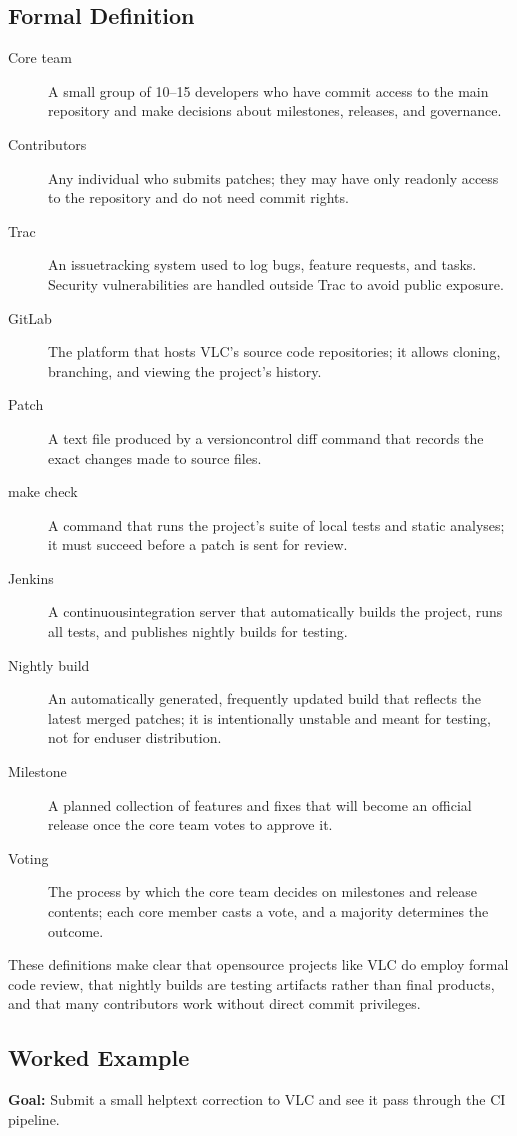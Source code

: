 \documentclass[12pt, a4paper]{article}
\begin{document}
\subsection{Formal Definition}
\begin{description}
\item[Core team] A small group of 10--15 developers who have commit access to the main repository and make decisions about milestones, releases, and governance.
\item[Contributors] Any individual who submits patches; they may have only readonly access to the repository and do not need commit rights.
\item[Trac] An issuetracking system used to log bugs, feature requests, and tasks. Security vulnerabilities are handled outside Trac to avoid public exposure.
\item[GitLab] The platform that hosts VLC's source code repositories; it allows cloning, branching, and viewing the project's history.
\item[Patch] A text file produced by a versioncontrol diff command that records the exact changes made to source files.
\item[make check] A command that runs the project's suite of local tests and static analyses; it must succeed before a patch is sent for review.
\item[Jenkins] A continuousintegration server that automatically builds the project, runs all tests, and publishes nightly builds for testing.
\item[Nightly build] An automatically generated, frequently updated build that reflects the latest merged patches; it is intentionally unstable and meant for testing, not for enduser distribution.
\item[Milestone] A planned collection of features and fixes that will become an official release once the core team votes to approve it.
\item[Voting] The process by which the core team decides on milestones and release contents; each core member casts a vote, and a majority determines the outcome.
\end{description}
These definitions make clear that opensource projects like VLC do employ formal code review, that nightly builds are testing artifacts rather than final products, and that many contributors work without direct commit privileges.

\subsection{Worked Example}
\textbf{Goal:} Submit a small helptext correction to VLC and see it pass through the CI pipeline.
\end{document}
